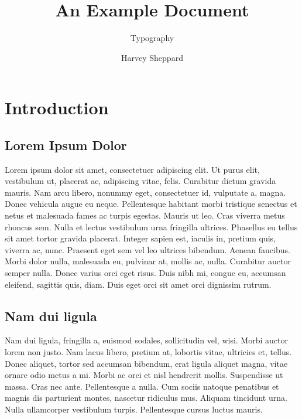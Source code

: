 \documentclass[portable]{yReport}
\author{Harvey Sheppard}
\subtitle{Typography}
\title{An Example Document}
\begin{document}

\chapter{Introduction}

\section{Lorem Ipsum Dolor}
Lorem ipsum dolor sit amet, consectetuer adipiscing elit. Ut purus elit,
vestibulum ut, placerat ac, adipiscing vitae, felis. Curabitur dictum gravida
mauris. Nam arcu libero, nonummy eget, consectetuer id, vulputate a, magna.
Donec vehicula augue eu neque. Pellentesque habitant morbi tristique
senectus et netus et malesuada fames ac turpis egestas\sideNote[white]{\lipsum[3]}. Mauris ut leo.
Cras viverra metus rhoncus sem. Nulla et lectus vestibulum urna fringilla
ultrices. Phasellus eu tellus sit amet tortor gravida placerat. Integer sapien
est, iaculis in, pretium quis, viverra ac, nunc. Praesent eget sem vel leo ultrices bibendum. Aenean faucibus. Morbi dolor nulla, malesuada eu, pulvinar
at, mollis ac, nulla. Curabitur auctor semper nulla. Donec varius orci eget
risus. Duis nibh mi, congue eu, accumsan eleifend, sagittis quis, diam. Duis
eget orci sit amet orci dignissim rutrum.

\section{Nam dui ligula}

Nam dui ligula, fringilla a, euismod sodales, sollicitudin vel, wisi. Morbi auctor lorem non justo. Nam lacus libero, pretium at, lobortis vitae, ultricies et, tellus. Donec aliquet, tortor sed accumsan bibendum, erat ligula aliquet magna, vitae ornare odio metus a mi. Morbi ac orci et nisl hendrerit mollis. Suspendisse ut massa. Cras nec ante. Pellentesque a nulla. Cum sociis natoque penatibus et magnis dis parturient montes, nascetur ridiculus mus. Aliquam tincidunt urna. Nulla ullamcorper vestibulum turpis. Pellentesque cursus luctus mauris.
\end{document}
